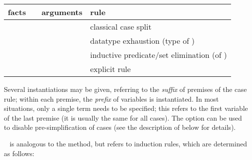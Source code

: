 \begin{isabellebody}
\begin{isamarkuptext}
\begin{description}
  \medskip
  \begin{tabular}{llll}
    facts           &                 & arguments   & rule \\\hline
                    & \hyperlink{method.cases}{\mbox{\isa{cases}}} &             & classical case split \\
                    & \hyperlink{method.cases}{\mbox{\isa{cases}}} & \isa{t}   & datatype exhaustion (type of \isa{t}) \\
    \isa{{\isaliteral{22}{\isachardoublequote}}{\isaliteral{5C3C7475726E7374696C653E}{\isasymturnstile}}\ A\ t{\isaliteral{22}{\isachardoublequote}}} & \hyperlink{method.cases}{\mbox{\isa{cases}}} & \isa{{\isaliteral{22}{\isachardoublequote}}{\isaliteral{5C3C646F74733E}{\isasymdots}}{\isaliteral{22}{\isachardoublequote}}} & inductive predicate/set elimination (of \isa{A}) \\
    \isa{{\isaliteral{22}{\isachardoublequote}}{\isaliteral{5C3C646F74733E}{\isasymdots}}{\isaliteral{22}{\isachardoublequote}}}     & \hyperlink{method.cases}{\mbox{\isa{cases}}} & \isa{{\isaliteral{22}{\isachardoublequote}}{\isaliteral{5C3C646F74733E}{\isasymdots}}\ rule{\isaliteral{3A}{\isacharcolon}}\ R{\isaliteral{22}{\isachardoublequote}}} & explicit rule \isa{R} \\
  \end{tabular}
  \medskip

  Several instantiations may be given, referring to the \emph{suffix}
  of premises of the case rule; within each premise, the \emph{prefix}
  of variables is instantiated.  In most situations, only a single
  term needs to be specified; this refers to the first variable of the
  last premise (it is usually the same for all cases).  The  option can be used to disable pre-simplification of
  cases (see the description of \hyperlink{method.induct}{\mbox{}} below for details).

  \item \hyperlink{method.induct}{\mbox{}}~ is analogous to the
  \hyperlink{method.cases}{\mbox{}} method, but refers to induction rules, which are
  determined as follows:


\end{description}
\end{isamarkuptext}
\end{isabellebody}

